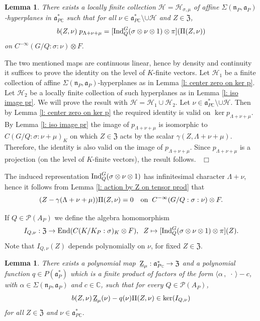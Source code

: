 \documentclass[12pt,a4paper]{article}
\newtheorem{Lemma}[Thm]{Lemma}
\newenvironment{lemma}[0]{\begin{Lemma}\noindent}%
{\end{Lemma}}
\def\proof{\par\noindent{\it Proof.}{\ }{\ }}
\def\qed{~\hfill\hbox{$\Box$}\medbreak}
\def\msy#1{{\mathbb #1}}
\def\C{{\msy C}}
\def\ga{\alpha}
\def\gg{\gamma}
\def\gs{\sigma}
\def\gS{\Sigma}
\def\got#1{\mathfrak #1}
\def\fa{{\got a}}
\def\fn{{\got n}}
\def\to{\rightarrow}
\def\inp#1#2{\langle#1\,,\,#2\rangle}
\def\End{{\rm End}}
\def\iC{{\scriptscriptstyle \C}}
\def\cH{{\mathcal H}}
\def\cP{{\mathcal P}}
\numberwithin{Thm}{section}
\numberwithin{equation}{section}
\def\Ind{{\rm Ind}}
\def\dotvar{\, \cdot\,}
\def\fZ{{\mathfrak Z}}
\def\faPdc{{\fa_{P\iC}^*}}
\def\gL{\Lambda}
\numberwithin{equation}{section}
\def\fZ{{\mathfrak Z}}
\def\gL{\Lambda}
\def\faPdc{\fa_{P\iC}^*}
\def\faP{\fa_P}
\def\ulrmZ{\,\underline{\rm Z}_\mu}
\def\bfhyp{hyperplanes}
\begin{document}
\begin{lemma}
\label{l: p and b and D}
There exists a locally finite collection $\cH = \cH_{\gs,\mu}$ of affine $\gS(\fn_P, \fa_P)$-hyper\-planes in $\faPdc$ such that for all $\nu \in \faPdc \setminus \cup \cH$ and $Z \in \fZ$, 
$$ 
b(Z, \nu)\; p_{\gL + \nu + \mu} = [\Ind_Q^G(\gs \otimes \nu \otimes 1) \otimes \pi](\Pi(Z, \nu))
$$ 
on 
$C^{-\infty}(G/Q: \gs :\nu) \otimes F.$
\end{lemma}
%

\proof 
The two mentioned maps are continuous linear, hence by density and continuity it
suffices to prove the identity on the level of $K$-finite vectors.
Let $\cH_1$ be a finite collection of affine $\gS(\fn_P,\faP)$-{\bfhyp} as
in Lemma \ref{l: center zero on ker p}.
Let $\cH_2$ be a locally finite collection of such {\bfhyp} as in Lemma \ref{l: iso image pr}. 
We will prove the result with $\cH = \cH_1 \cup \cH_2.$ 
Let $\nu \in \faPdc\setminus \cup \cH.$ Then by Lemma \ref{l: center zero on ker p} the required identity is valid on $\ker p_{\gL + \nu + \mu}.$ By Lemma \ref{l: iso image pr} the image of $p_{\gL + \nu +\mu}$ 
is isomorphic to $C(G/Q:\gs: \nu + \mu)_K$ on which $Z \in \fZ$ acts by the 
scalar  $\gg(Z, \gL + \nu + \mu).$ Therefore, the identity is also valid on the image
of $p_{\gL + \nu +\mu}.$ Since $p_{\gL + \nu + \mu}$ is a projection (on the level of $K$-finite vectors), the result follows.
\qed

%
The induced representation $\Ind_Q^G(\gs\otimes \nu \otimes 1)$
has infinitesimal character $\gL + \nu$, hence it follows from 
Lemma \ref{l: action by Z on tensor prod} that 
$$ 
(Z - \gg(\gL + \nu + \mu)) \Pi(Z, \nu) = 0 \quad{\rm on} \;\; C^{-\infty}(G/Q: \gs :\nu) \otimes F.
$$


If $Q \in \cP(A_P)$ we define the algebra homomorphism 
$$ 
I_{Q,\nu}: \fZ \to \End(C(K/K_P :\gs)_K\otimes F), \;\;Z \mapsto  
[\Ind_Q^G(\gs\otimes \nu \otimes 1) \otimes \pi](Z).
$$%
Note that $I_{Q,\nu}(Z)$ depends polynomially on $\nu$, for fixed $Z \in \fZ.$ 

\begin{lemma}
\label{l: intro Z mu}
There exists a polynomial map $\ulrmZ: \faPdc \to \fZ$ and a polynomial 
function $q \in P(\fa_P^*)$ which is a finite product of factors of the form 
$\inp{\ga}{\dotvar} - c$, with $\ga \in \gS(\fn_P, \fa_P)$ and $c \in \C$,  such that
for every $Q \in \cP(A_P)$,
$$ 
b(Z,\nu) \ulrmZ(\nu)  -  q(\nu) \Pi(Z, \nu) \in \ker(I_{Q,\nu}) 
$$ 
for all $Z \in\fZ$ and  $\nu \in \faPdc.$ 
\end{lemma}
\end{document}
